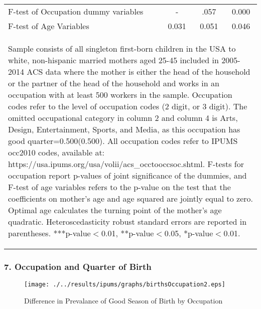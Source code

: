 \documentclass[10pt,letterpaper,subeqn]{beamer}
\begin{document}
\begin{frame}
\begin{table}[htbp]
{\begin{tabular}{l*{3}{c}}
F-test of Occupation dummy variables&-&.057&0.000\\
F-test of Age Variables&0.031&0.051&0.046\\ \bottomrule
\multicolumn{4}{p{15.4cm}}{\begin{footnotesize}Sample consists of all
 singleton first-born children in the USA to white, non-hispanic
married mothers aged 25-45 included in 2005-2014 ACS data where the
mother is either the head of the household or the partner of the head
 of the household and works in an occupation with at least 500
workers in the sample. Occupation codes refer to the level of
occupation codes (2 digit, or 3 digit). The omitted occupational
category in column 2 and column 4 is Arts, Design, Entertainment,
Sports, and Media, as this occupation has good quarter=0.500(0.500).
 All occupation codes refer to IPUMS occ2010 codes, available at:
https://usa.ipums.org/usa/volii/acs\_occtooccsoc.shtml. F-tests for
occupation report p-values of joint significance of the dummies, and
F-test of age variables refers to the p-value on the test that               the coefficients on mother's age and age squared are jointly equal               to zero.  Optimal age calculates the turning point of the mother's age               quadratic.  Heteroscedasticity robust standard errors are reported in              parentheses. ***p-value$<$0.01, **p-value$<$0.05, *p-value$<$0.01.
\end{footnotesize}}\end{tabular}}\end{table}
\end{frame}


\begin{frame}
\frametitle{7. Occupation and Quarter of Birth}
\begin{figure}[htpb!]
\begin{center}
  \centering
  \caption{Difference in Prevalance of Good Season of Birth by Occupation}
  \texttt{[image: ./../results/ipums/graphs/birthsOccupation2.eps]}
  \label{fig:goodByOcc2}
\end{center}
\end{figure}
\end{frame}
\end{document}

